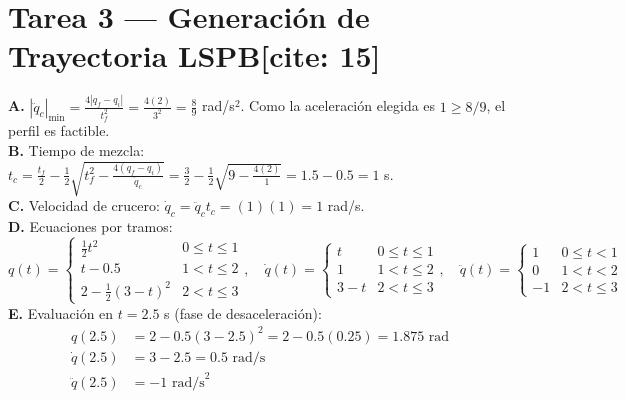 \documentclass[11pt, a4paper]{article}
\begin{document}
\section*{Tarea 3 — Generación de Trayectoria LSPB[cite: 15]}
\textbf{A.} $|\ddot{q}_c|_{\min} = \frac{4|q_f - q_i|}{t_f^2} = \frac{4(2)}{3^2} = \frac{8}{9}$ rad/s$^2$. Como la aceleración elegida es $1 \ge 8/9$, el perfil es factible.\\
\textbf{B.} Tiempo de mezcla: $t_c = \frac{t_f}{2} - \frac{1}{2}\sqrt{t_f^2 - \frac{4(q_f - q_i)}{\ddot{q}_c}} = \frac{3}{2} - \frac{1}{2}\sqrt{9 - \frac{4(2)}{1}} = 1.5 - 0.5 = 1$ s.\\
\textbf{C.} Velocidad de crucero: $\dot{q}_c = \ddot{q}_c t_c = (1)(1) = 1$ rad/s.\\
\textbf{D.} Ecuaciones por tramos:
\begin{equation*}
    q(t) = \begin{cases} \frac{1}{2}t^2 & 0 \le t \le 1 \\ t - 0.5 & 1 < t \le 2 \\ 2 - \frac{1}{2}(3-t)^2 & 2 < t \le 3 \end{cases}, \quad
    \dot{q}(t) = \begin{cases} t & 0 \le t \le 1 \\ 1 & 1 < t \le 2 \\ 3-t & 2 < t \le 3 \end{cases}, \quad
    \ddot{q}(t) = \begin{cases} 1 & 0 \le t < 1 \\ 0 & 1 < t < 2 \\ -1 & 2 < t \le 3 \end{cases}
\end{equation*}
\textbf{E.} Evaluación en $t=2.5$ s (fase de desaceleración):
\begin{align*}
    q(2.5) &= 2 - 0.5(3 - 2.5)^2 = 2 - 0.5(0.25) = 1.875 \text{ rad} \\
    \dot{q}(2.5) &= 3 - 2.5 = 0.5 \text{ rad/s} \\
    \ddot{q}(2.5) &= -1 \text{ rad/s}^2
\end{align*}
\end{document}
